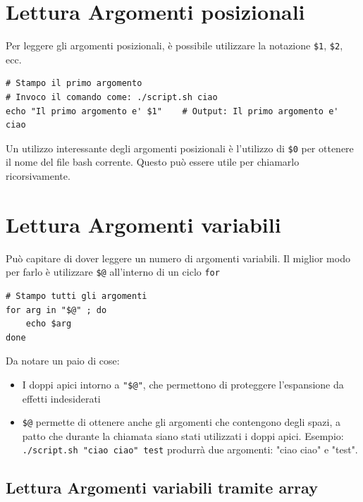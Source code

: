 \documentclass[a4paper]{report}
\newenvironment{info}{\begin{tcolorbox}[fonttitle=\sffamily\bfseries\large,title=Info,colframe=blue!75!white]}{\end{tcolorbox}}
\newenvironment{code}{\begin{tcolorbox}[size=small]}{\end{tcolorbox}}
\begin{document}
\section{Lettura Argomenti posizionali}

Per leggere gli argomenti posizionali, è possibile utilizzare la notazione \texttt{\$1}, \texttt{\$2}, ecc.

\begin{code}
\begin{lstlisting}
# Stampo il primo argomento
# Invoco il comando come: ./script.sh ciao
echo "Il primo argomento e' $1"    # Output: Il primo argomento e' ciao
\end{lstlisting}
\end{code}

Un utilizzo interessante degli argomenti posizionali è l'utilizzo di \texttt{\$0} per ottenere il nome del file bash corrente. Questo può essere utile per chiamarlo ricorsivamente.

\section{Lettura Argomenti variabili}

Può capitare di dover leggere un numero di argomenti variabili. Il miglior modo per farlo è utilizzare \texttt{\$@} all'interno di un ciclo \texttt{for}

\begin{code}
\begin{lstlisting}
# Stampo tutti gli argomenti
for arg in "$@" ; do
	echo $arg
done
\end{lstlisting}
\end{code}

\begin{info}
Da notare un paio di cose:
\begin{itemize}
	\item I doppi apici intorno a \texttt{"\$@"}, che permettono di proteggere l'espansione da effetti indesiderati
	\item \texttt{\$@} permette di ottenere anche gli argomenti che contengono degli spazi, a patto che durante la chiamata siano stati utilizzati i doppi apici. Esempio: \texttt{./script.sh "ciao ciao" test} produrrà due argomenti: "ciao ciao" e "test".
\end{itemize}
\end{info}

\subsection{Lettura Argomenti variabili tramite array}
\end{document}
